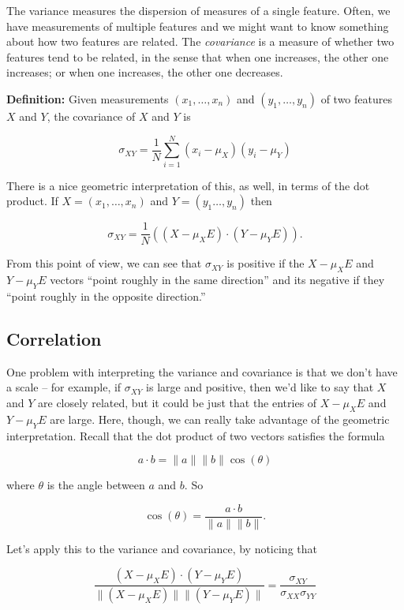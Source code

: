 \documentclass[
  oneside]{scrbook}
\begin{document}
The variance measures the dispersion of measures of a single feature.
Often, we have measurements of multiple features and we might want to
know something about how two features are related. The \emph{covariance}
is a measure of whether two features tend to be related, in the sense
that when one increases, the other one increases; or when one increases,
the other one decreases.

\textbf{Definition:} Given measurements \((x_1,\ldots, x_n)\) and
\((y_1,\ldots, y_n)\) of two features \(X\) and \(Y\), the covariance of
\(X\) and \(Y\) is

\begin{equation}
\sigma_{XY} = \frac{1}{N}\sum_{i=1}^{N} (x_i-\mu_{X})(y_i-\mu_{Y})
\label{eq:covariancedot}\end{equation}

There is a nice geometric interpretation of this, as well, in terms of
the dot product. If \(X=(x_1,\ldots, x_n)\) and \(Y=(y_1\ldots,y_n)\)
then

\[
\sigma_{XY} = \frac{1}{N} ((X-\mu_{X}E)\cdot (Y-\mu_{Y}E)).
\]

From this point of view, we can see that \(\sigma_{XY}\) is positive if
the \(X-\mu_{X}E\) and \(Y-\mu_{Y}E\) vectors ``point roughly in the
same direction'' and its negative if they ``point roughly in the
opposite direction.''

\hypertarget{correlation}{%
\subsection{Correlation}\label{correlation}}

One problem with interpreting the variance and covariance is that we
don't have a scale -- for example, if \(\sigma_{XY}\) is large and
positive, then we'd like to say that \(X\) and \(Y\) are closely
related, but it could be just that the entries of \(X-\mu_{X}E\) and
\(Y-\mu_{Y}E\) are large. Here, though, we can really take advantage of
the geometric interpretation. Recall that the dot product of two vectors
satisfies the formula

\[
a \cdot b = \|a\|\|b\|\cos(\theta)
\]

where \(\theta\) is the angle between \(a\) and \(b\). So

\[
\cos(\theta) = \frac{a\cdot b}{\|a\|\|b\|}.
\]

Let's apply this to the variance and covariance, by noticing that

\[
\frac{(X-\mu_{X}E)\cdot (Y-\mu_{Y}E)}{\|(X-\mu_{X}E)\|\|(Y-\mu_{Y}E)\|} = \frac{\sigma_{XY}}{\sigma_{XX}\sigma_{YY}}
\]
\end{document}
